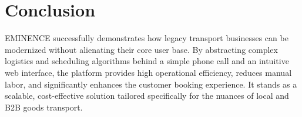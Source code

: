 \documentclass[journal,10pt,twocolumn]{IEEEtran}
\begin{document}
\section{Conclusion}
EMINENCE successfully demonstrates how legacy transport businesses can be modernized without alienating their core user base. By abstracting complex logistics and scheduling algorithms behind a simple phone call and an intuitive web interface, the platform provides high operational efficiency, reduces manual labor, and significantly enhances the customer booking experience. It stands as a scalable, cost-effective solution tailored specifically for the nuances of local and B2B goods transport.
\end{document}
